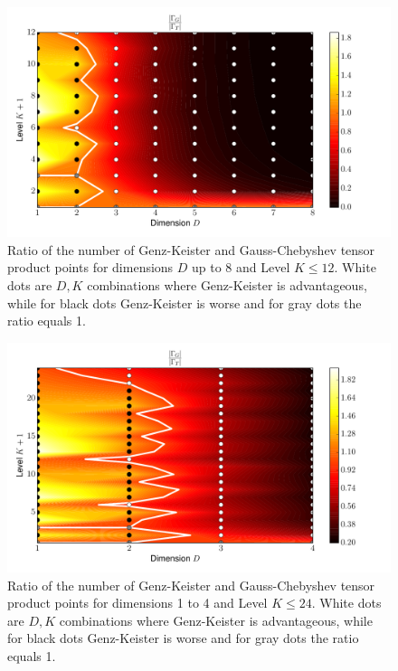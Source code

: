 \documentclass[a4paper,10pt]{article}
\begin{document}
\begin{figure}[h]
  \centering
  \includegraphics[width=0.8\linewidth]{./img/gk_chebyshevt_ratio.pdf}
  \caption{Ratio of the number of Genz-Keister and Gauss-Chebyshev tensor product
  points for dimensions $D$ up to 8 and Level $K \leq 12$. White dots are $D,K$
  combinations where Genz-Keister is advantageous, while for black dots
  Genz-Keister is worse and for gray dots the ratio equals 1.}
  \label{fig:gk_chebyshevt_ratio}
\end{figure}

\begin{figure}[h]
  \centering
  \includegraphics[width=0.8\linewidth]{./img/gk_chebyshevt_ratio_large.pdf}
  \caption{Ratio of the number of Genz-Keister and Gauss-Chebyshev tensor product
  points for dimensions 1 to 4 and Level $K \leq 24$. White dots are $D,K$
  combinations where Genz-Keister is advantageous, while for black dots
  Genz-Keister is worse and for gray dots the ratio equals 1.}
  \label{fig:gk_chebyshevt_ratio_large}
\end{figure}
\end{document}
